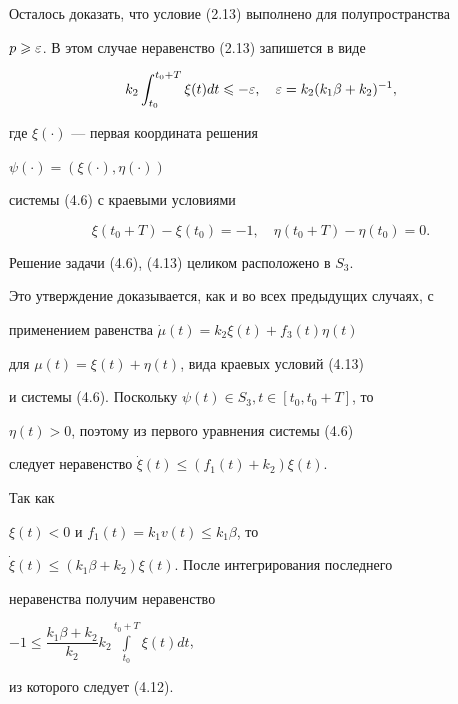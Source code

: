 Осталось доказать, что условие (2.13) выполнено для полупространства


$p\geqslant \varepsilon$. В этом случае неравенство (2.13) запишется в виде


%


\begin{equation}


k_2\int_{t_0}^{t_0+T}\xi(t) dt \le -\eps,\quad


\eps=k_2(k_1\beta + k_2)^{-1},


\end{equation}


%


где $\xi(\cdot)$ --- первая координата решения


$\psi(\cdot)=(\xi(\cdot), \eta(\cdot))$


системы (4.6) с краевыми условиями


%


\begin{equation}


\xi(t_0+T)-\xi(t_0)= -1,\quad


\eta(t_0+T) - \eta(t_0)=0.


\end{equation}


%


Решение задачи (4.6), (4.13) целиком расположено в $S_3$.


Это утверждение доказывается, как и во всех предыдущих случаях, с


применением равенства $\Dot \mu(t)=k_2\xi(t) + f_3(t)\eta(t)$


для $\mu(t)=\xi(t)+\eta(t)$, вида краевых условий (4.13)


и системы (4.6). Поскольку $\psi(t) \in S_3, t\in [t_0,t_0+T]$, то


$\eta(t) > 0$, поэтому из первого уравнения системы (4.6)


следует неравенство $\Dot\xi(t) \le (f_1(t) + k_2)\xi(t)$.


Так как


$\xi(t) < 0$ и $f_1(t)=k_1v(t)\le k_1\beta$, то


$\Dot \xi(t)\le (k_1\beta + k_2)\xi(t)$. После интегрирования последнего


неравенства получим неравенство


$-1\le \dfrac{k_1\beta + k_2}{k_2} k_2\int\limits_{t_0}^{t_0+T}\xi(t) dt$,


из которого следует (4.12).





